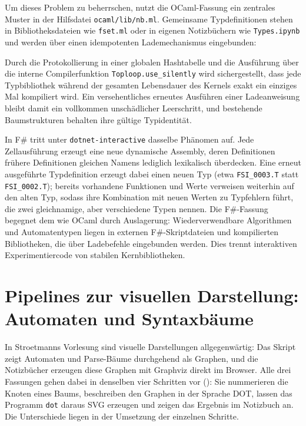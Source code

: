 Um dieses Problem zu beherrschen, nutzt die OCaml-Fassung ein zentrales Muster in der Hilfsdatei \texttt{ocaml/\allowbreak lib/\allowbreak nb.ml}.
Gemeinsame Typdefinitionen stehen in Bibliotheksdateien wie \texttt{fset.ml} oder in eigenen Notizbüchern wie \texttt{Types.ipynb} und werden über einen idempotenten Lademechanismus eingebunden:



Durch die Protokollierung in einer globalen Hashtabelle und die Ausführung über die interne Compilerfunktion \texttt{Toploop.use\_silently} wird sichergestellt, dass jede Typbibliothek während der gesamten Lebensdauer des Kernels exakt ein einziges Mal kompiliert wird.
Ein versehentliches erneutes Ausführen einer Ladeanweisung bleibt damit ein vollkommen unschädlicher Leerschritt, und bestehende Baumstrukturen behalten ihre gültige Typidentität.

In F\# tritt unter \texttt{dotnet-interactive} dasselbe Phänomen auf.
Jede Zellausführung erzeugt eine neue dynamische Assembly, deren Definitionen frühere Definitionen gleichen Namens lediglich lexikalisch überdecken.
Eine erneut ausgeführte Typdefinition erzeugt dabei einen neuen Typ (etwa \texttt{FSI\_0003.T} statt \texttt{FSI\_0002.T}); bereits vorhandene Funktionen und Werte verweisen weiterhin auf den alten Typ, sodass ihre Kombination mit neuen Werten zu Typfehlern führt, die zwei gleichnamige, aber verschiedene Typen nennen.
Die F\#-Fassung begegnet dem wie OCaml durch Auslagerung: Wiederverwendbare Algorithmen und Automatentypen liegen in externen F\#-Skriptdateien und kompilierten Bibliotheken, die über Ladebefehle eingebunden werden.
Dies trennt interaktiven Experimentiercode von stabilen Kernbibliotheken.

\section{Pipelines zur visuellen Darstellung: Automaten und Syntaxbäume}
\label{sec:kernels_visualization}

In Stroetmanns Vorlesung sind visuelle Darstellungen allgegenwärtig: Das Skript zeigt Automaten und Parse-Bäume durchgehend als Graphen, und die Notizbücher erzeugen diese Graphen mit Graphviz direkt im Browser.
Alle drei Fassungen gehen dabei in denselben vier Schritten vor (): Sie nummerieren die Knoten eines Baums, beschreiben den Graphen in der Sprache DOT, lassen das Programm \texttt{dot} daraus SVG erzeugen und zeigen das Ergebnis im Notizbuch an.
Die Unterschiede liegen in der Umsetzung der einzelnen Schritte.

